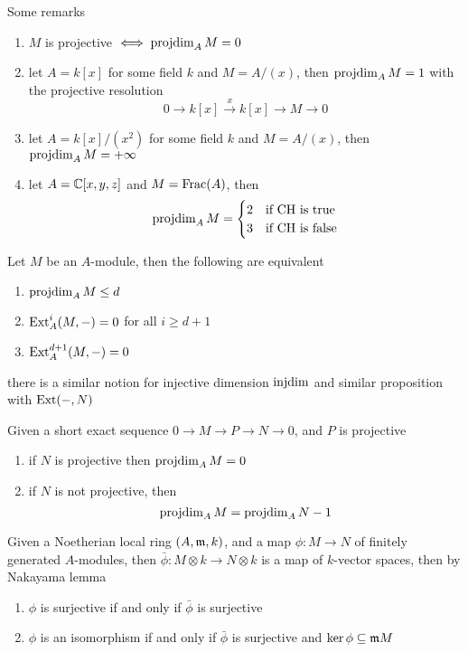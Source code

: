 \begin{remark}
	Some remarks
	\begin{enumerate}
		\item $M$ is projective $\iff \operatorname{projdim}_A M = 0$
		\item let $A = k[x]$ for some field $k$ and $M = A / (x)$, then $\operatorname{projdim}_A M = 1$ with the projective resolution
		$$
			0 \to k[x] \xrightarrow{x} k[x] \to M \to 0
		$$
		
		\item let $A = k[x] / (x^2)$ for some field $k$ and $M = A / (x)$, then $\operatorname{projdim}_A M = +\infty$
		
		\item let $A = \mathbb{C}[x, y, z]$ and $M = \operatorname{Frac}(A)$, then
		$$
			\operatorname{projdim}_A M = \begin{cases}
				2 &\text{if CH is true} \\
				3 &\text{if CH is false}
			\end{cases}
		$$
	\end{enumerate}
\end{remark}

\begin{proposition}
	Let $M$ be an $A$-module, then the following are equivalent
	\begin{enumerate}
		\item $\operatorname{projdim}_A M \leq d$
		\item $\operatorname{Ext}^i_A(M, -) = 0$ for all $i \geq d+1$
		\item $\operatorname{Ext}^{d+1}_A(M, -) = 0$
	\end{enumerate}
\end{proposition}

\begin{remark}
	there is a similar notion for injective dimension $\operatorname{injdim}$ and similar proposition with $\operatorname{Ext}(-, N)$
\end{remark}

\begin{corollary}
	Given a short exact sequence $0 \to M \to P \to N \to 0$, and $P$ is projective
	\begin{enumerate}
		\item if $N$ is projective then $\operatorname{projdim}_A M = 0$
		\item if $N$ is not projective, then
		$$
			\operatorname{projdim}_A M = \operatorname{projdim}_A N - 1
		$$
	\end{enumerate}
\end{corollary}


Given a Noetherian local ring $(A, \mathfrak{m}, k)$, and a map $\phi: M \to N$ of finitely generated $A$-modules, then $\bar{\phi}: M \otimes k \to N \otimes k$ is a map of $k$-vector spaces, then by Nakayama lemma
\begin{enumerate}
	\item $\phi$ is surjective if and only if $\bar{\phi}$ is surjective
	\item $\phi$ is an isomorphism if and only if $\bar{\phi}$ is surjective and $\ker \phi \subseteq \mathfrak{m} M$
\end{enumerate}

